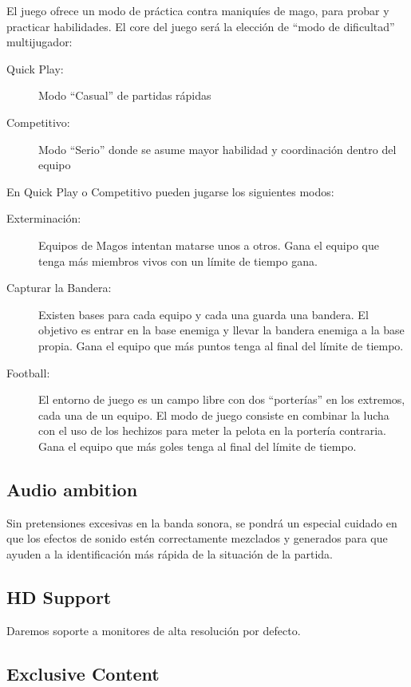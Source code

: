 \documentclass[12pt]{article}
\begin{document}
El juego ofrece un modo de práctica contra maniquíes de mago, para probar y practicar habilidades. El core del juego será la elección de ``modo de dificultad'' multijugador:

\begin{description}
\item[Quick Play:] Modo ``Casual'' de partidas rápidas
\item[Competitivo:] Modo ``Serio'' donde se asume mayor habilidad y coordinación dentro del equipo
\end{description}

\newpage

En Quick Play o Competitivo pueden jugarse los siguientes modos:

\begin{description}
\item[Exterminación:] Equipos de Magos intentan matarse unos a otros. Gana el equipo que tenga más miembros vivos con un límite de tiempo gana.
\item[Capturar la Bandera:] Existen bases para cada equipo y cada una guarda una bandera. El objetivo es entrar en la base enemiga y llevar la bandera enemiga a la base propia. Gana el equipo que más puntos tenga al final del límite de tiempo.
\item[Football:] El entorno de juego es un campo libre con dos ``porterías'' en los extremos, cada una de un equipo. El modo de juego consiste en combinar la lucha con el uso de los hechizos para meter la pelota en la portería contraria. Gana el equipo que más goles tenga al final del límite de tiempo.
\end{description}

\subsection{Audio ambition}

Sin pretensiones excesivas en la banda sonora, se pondrá un especial cuidado en que los efectos de sonido estén correctamente mezclados y generados para que ayuden a la identificación más rápida de la situación de la partida.

\subsection{HD Support}

Daremos soporte a monitores de alta resolución por defecto.

\subsection{Exclusive Content}
\end{document}
